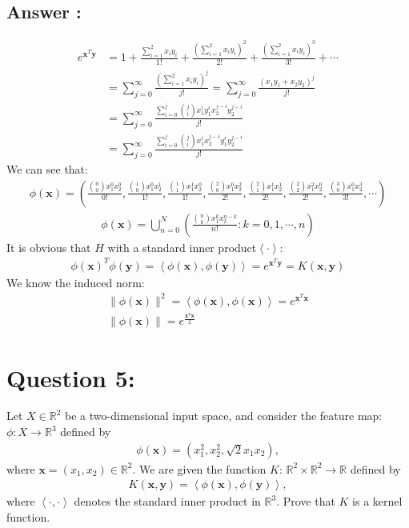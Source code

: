 \documentclass[a4paper,12pt]{article}
\newcommand{\R}{\mathbb{R}}
\begin{document}
\subsection*{Answer :}
\begin{align*}
    e^{\bm{x}^T\bm{y}} &= 1 + \frac{\sum_{i=1}^{2}x_iy_i}{1!} + \frac{(\sum_{i=1}^{2}x_iy_i)^2}{2!} + \frac{(\sum_{i=1}^{2}x_iy_i)^3}{3!} + \cdots \\
    &= \sum_{j=0}^{\infty}\frac {(\sum_{i=1}^{2}x_iy_i)^j} {j!} = \sum_{j=0}^{\infty}\frac {(x_1y_1 + x_2y_2)^j} {j!}  \\
    &= \sum_{j=0}^{\infty} \frac {\sum_{i=0}^{j}\binom ji x_1^iy_1^ix_2^{j-i}y_2^{j-i}} {j!} \\
    &= \sum_{j=0}^{\infty} \frac {\sum_{i=0}^{j}\binom ji x_1^ix_2^{j-i}y_1^iy_2^{j-i}} {j!}
\end{align*}
We can see that:
\begin{align*}
    \phi(\bm{x}) = \left(\frac {\binom{0}{0} x_1^0x_2^0}{0!} , \frac {\binom{1}{0} x_1^0x_2^1}{1!} , \frac {\binom{1}{1} x_1^1x_2^0}{1!} , \frac {\binom{2}{0} x_1^0x_2^2}{2!} , \frac {\binom{2}{1} x_1^1x_2^1}{2!} , \frac {\binom{2}{2} x_1^2x_2^0}{2!} , \frac {\binom{3}{0} x_1^0x_2^3}{3!} , \cdots\right)
\end{align*}
\begin{align*}
    \phi(\bm{x}) = \bigcup_{n = 0}^{N}(\frac {\binom{n}{k} x_1^kx_2^{n-k}} {n!} :k=0, 1, \cdots, n)
\end{align*}
It is obvious that \(H\) with a standard inner product\(\left<\cdot\right>\):
\begin{align*}
    \phi(\bm{x})^T\phi(\bm{y}) = \left<\phi(\bm{x}), \phi(\bm{y})\right> = e^{\bm{x}^T\bm{y}} = K(\bm{x}, \bm{y})
\end{align*}
We know the induced norm:
\begin{align*}
    \|\phi(\bm{x})\|^2 = \left<\phi(\bm{x}), \phi(\bm{x})\right> = e^{\bm{x}^T\bm{x}}   \\
    \|\phi(\bm{x})\| = e^{\frac {\bm{x}^T\bm{x}} 2}
\end{align*}

\section*{Question 5:}
Let \(X \in \R^2\) be a two-dimensional input space, and consider the feature map: \(\phi: X \to \R^3\) defined by
\begin{align*}
    \phi(\bm{x}) = (x_1^2, x_2^2, \sqrt 2 x_1x_2),
\end{align*}
where \(\bm{x} = (x_1, x_2) \in \R^2\). We are given the function \(K\): \(\R^2 \times \R^2 \to \R\) defined by
\begin{align*}
    K(\bm{x}, \bm{y}) = \left< \phi(\bm{x}), \phi(\bm{y})\right>,
\end{align*}
where \(\left<\cdot , \cdot\right>\) denotes the standard inner product in \(\R^3\). Prove that \(K\) is a kernel function.
\end{document}
